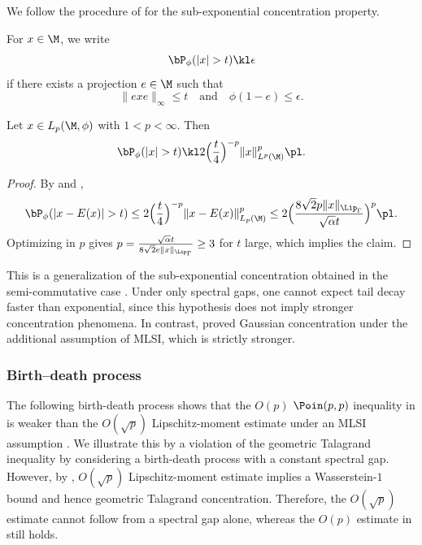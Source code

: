 \documentclass[sn-mathphys-num]{sn-jnl}
\begin{document}
We follow the procedure of \cite{Gao_Junge_LaRacuente_Li_2025} for the sub-exponential concentration property.
\begin{definition}
For $x\in\M$, we write
\[
\bP_{\phi}(|x|>t)\kl\epsilon
\]
if there exists a projection $e\in\M$ such that
\[
\|exe\|_{\infty}\le t
\quad\text{and}\quad
\phi(1-e)\le\epsilon .
\]
\end{definition}

\begin{lemma}\label{lem:cheb}
Let $x\in L_p(\M,\phi)$ with $1<p<\infty$. Then
\[
\bP_{\phi}(|x|>t)
\kl
2\Bigl(\frac{t}{4}\Bigr)^{-p}\|x\|_{L^p(\M)}^{p}\pl .
\]
\end{lemma}


\begin{proof}
By  and ,
\[
\bP_{\phi}(|x-E(x)|>t)
\le
2\Bigl(\frac{t}{4}\Bigr)^{-p}\|x-E(x)\|_{L_p(\M)}^{p}
\le
2\Bigl(\frac{8\sqrt{2}p\|x\|_{\Lip_\Gamma}}{\sqrt{\alpha} t}\Bigr)^{p}\pl .
\]
Optimizing in $p$ gives $p=\frac{\sqrt{\alpha} t}{8\sqrt{2}e\|x\|_{\Lip_\Gamma}}\ge3$ for $t$ large, which implies the claim.
\end{proof}
This is a generalization of the sub-exponential concentration obtained in the semi-commutative case \cite[Thm~2.7]{huang2021poincare}. Under only spectral gaps, one cannot expect tail decay faster than exponential, since this hypothesis does not imply stronger concentration phenomena. In contrast, \cite[Cor~5.15]{junge2015noncommutative} proved Gaussian concentration under the additional assumption of MLSI, which is strictly stronger.
\subsubsection{Birth--death process}
The following birth-death process shows that the $O(p)$ $\Poin(p,p)$ inequality in  is weaker than the $O(\sqrt p)$ Lipschitz-moment estimate under an MLSI assumption \cite[Theorem~5.12]{Gao_Junge_LaRacuente_Li_2025}.
We illustrate this by a violation of the geometric Talagrand inequality by considering a birth-death process with a constant spectral gap.
However, by \cite[Thm~6.10 and Rem.~6.9]{gao_fisher_2020}, $O(\sqrt p)$ Lipschitz-moment estimate implies a Wasserstein-$1$ bound and hence geometric Talagrand concentration. Therefore, the $O(\sqrt p)$ estimate cannot follow from a spectral gap alone, whereas the $O(p)$ estimate in  still holds.
\end{document}
